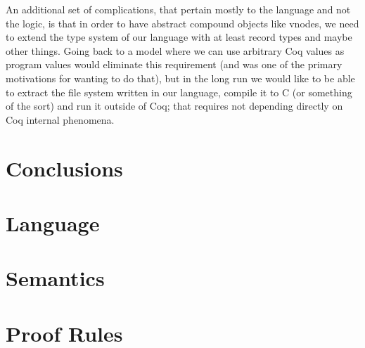 An additional set of complications, that pertain mostly to the
language and not the logic, is that in order to have abstract compound
objects like vnodes, we need to extend the type system of our language
with at least record types and maybe other things.
Going back to a model where we can use arbitrary Coq values as program
values would eliminate this requirement (and was one of the primary
motivations for wanting to do that), but in the long run we would
like to be able to extract the file system written in our language,
compile it to C (or something of the sort) and run it outside of Coq;
that requires not depending directly on Coq internal phenomena.

\section{Conclusions}
\label{sec:conclusions}


\appendix
\section{Language}
\label{sec:appendix_ast}
\section{Semantics}
\label{sec:appendix_semantics}
\section{Proof Rules}
\label{sec:appendix_logic}
